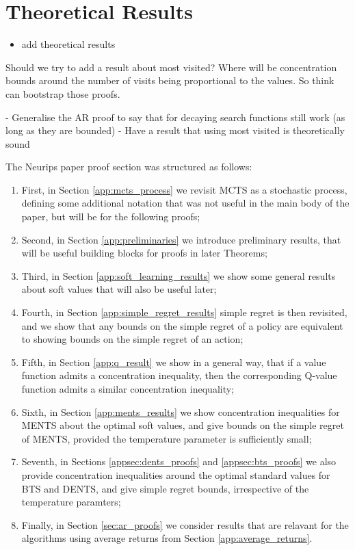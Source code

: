 \section{Theoretical Results}
\label{sec:4-5-theory}

    \begin{itemize}
        \item add theoretical results
    \end{itemize}

    Should we try to add a result about most visited? Where will be concentration bounds around the number of visits being proportional to the values. So think can bootstrap those proofs.

    - Generalise the AR proof to say that for decaying search functions still work (as long as they are bounded)
    - Have a result that using most visited is theoretically sound

    The Neurips paper proof section was structured as follows:
    \begin{enumerate}
        \item First, in Section \ref{app:mcts_process} we revisit MCTS as a stochastic process, defining some additional notation that was not useful in the main body of the paper, but will be for the following proofs;
        \item Second, in Section \ref{app:preliminaries} we introduce preliminary results, that will be useful building blocks for proofs in later Theorems;
        \item Third, in Section \ref{app:soft_learning_results} we show some general results about soft values that will also be useful later;
        \item Fourth, in Section \ref{app:simple_regret_results} simple regret is then revisited, and we show that any bounds on the simple regret of a policy are equivalent to showing bounds on the simple regret of an action;
        \item Fifth, in Section \ref{app:q_result} we show in a general way, that if a value function admits a concentration inequality, then the corresponding Q-value function admits a similar concentration inequality;
        \item Sixth, in Section \ref{app:ments_results} we show concentration inequalities for MENTS about the optimal soft values, and give bounds on the simple regret of MENTS, provided the temperature parameter is sufficiently small;
        \item Seventh, in Sections \ref{appsec:dents_proofs} and \ref{appsec:bts_proofs} we also provide concentration inequalities around the optimal standard values for BTS and DENTS, and give simple regret bounds, irrespective of the temperature paramters;
        \item Finally, in Section \ref{sec:ar_proofs} we consider results that are relavant for the algorithms using average returns from Section \ref{app:average_returns}.
    \end{enumerate}

